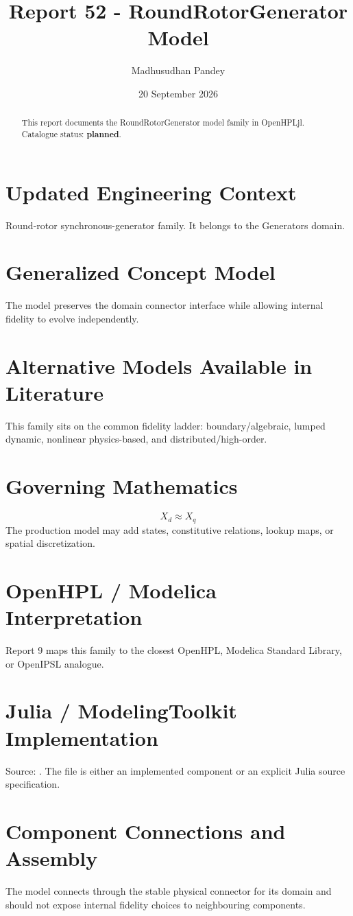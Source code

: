 \documentclass[10pt,a4paper]{article}
\title{Report 52 - RoundRotorGenerator Model}
\author{Madhusudhan Pandey}
\date{20 September 2026}
\begin{document}
\maketitle
\begin{abstract}This report documents the RoundRotorGenerator model family in OpenHPLjl. Catalogue status: \textbf{planned}.\end{abstract}
\section{Updated Engineering Context}Round-rotor synchronous-generator family. It belongs to the Generators domain.
\section{Generalized Concept Model}The model preserves the domain connector interface while allowing internal fidelity to evolve independently.
\section{Alternative Models Available in Literature}This family sits on the common fidelity ladder: boundary/algebraic, lumped dynamic, nonlinear physics-based, and distributed/high-order.
\section{Governing Mathematics}\[X_d\approx X_q\]The production model may add states, constitutive relations, lookup maps, or spatial discretization.
\section{OpenHPL / Modelica Interpretation}Report 9 maps this family to the closest OpenHPL, Modelica Standard Library, or OpenIPSL analogue.
\section{Julia / ModelingToolkit Implementation}Source: \texttt{}. The file is either an implemented component or an explicit Julia source specification.
\section{Component Connections and Assembly}The model connects through the stable physical connector for its domain and should not expose internal fidelity choices to neighbouring components.
\end{document}
